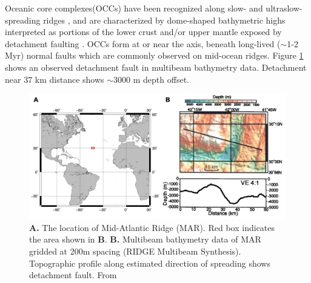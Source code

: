 \documentclass[letterpaper,12pt,notitle]{memphisthesis}                     %
\begin{document}
Oceanic core complexes(OCCs) have been recognized along slow- and ultraslow- spreading ridges \citep{Tucholke1998}, and are characterized by dome-shaped bathymetric highs interpreted as portions of the lower crust and/or upper mantle exposed by detachment faulting \citep{Tucholke1994}. OCCs form at or near the axis, beneath long-lived ($\sim$1-2 Myr) normal faults which are commonly observed on mid-ocean ridges. Figure \ref{fig:occ} shows an observed detachment fault in multibeam bathymetry data. Detachment near 37 km distance shows $\sim$3000 m depth offset.
%
\begin{figure}[!htb]
	\centering
	\includegraphics[width=0.9\linewidth,trim=4 4 4 4,clip]{./figs/occ.png}
	\caption{\textbf{A.} The location of Mid-Atlantic Ridge (MAR). Red box indicates the area shown in \textbf{B}. \textbf{B.} Multibeam bathymetry data of MAR gridded at 200m spacing (RIDGE Multibeam Synthesis). Topographic profile along estimated direction of spreading shows detachment fault. From \citet{Lavier2000}}
	\label{fig:occ}
\end{figure}
%
\end{document}
